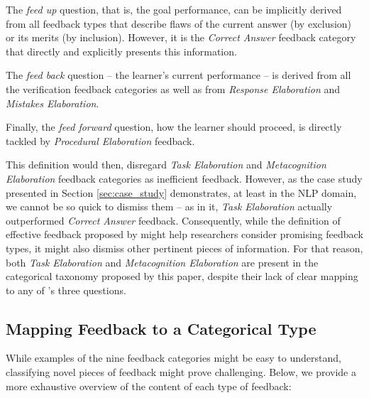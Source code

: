 The \textit{feed up} question, that is, the goal performance, can be implicitly derived from all feedback types that describe flaws of the current answer (by exclusion) or its merits (by inclusion). However, it is the \textit{Correct Answer} feedback category that directly and explicitly presents this information.

The \textit{feed back} question -- the learner's current performance -- is derived from all the verification feedback categories as well as from \textit{Response Elaboration} and \textit{Mistakes Elaboration}.

Finally, the \textit{feed forward} question, how the learner should proceed, is directly tackled by \textit{Procedural Elaboration} feedback.

This definition would then, disregard \textit{Task Elaboration} and \textit{Metacognition Elaboration} feedback categories as inefficient feedback. However, as the case study presented in Section \ref{sec:case_study} demonstrates, at least in the NLP domain, we cannot be so quick to dismiss them -- as in it, \textit{Task Elaboration} actually outperformed \textit{Correct Answer} feedback. Consequently, while the definition of effective feedback proposed by \citet{hattie_power_2007} might help researchers consider promising feedback types, it might also dismiss other pertinent pieces of information. For that reason, both \textit{Task Elaboration} and \textit{Metacognition Elaboration} are present in the categorical taxonomy proposed by this paper, despite their lack of clear mapping to any of \citet{hattie_power_2007}'s three questions.

\subsection{Mapping Feedback to a Categorical Type}
\label{app:categorial_mapping}

While examples of the nine feedback categories might be easy to understand, classifying novel pieces of feedback might prove challenging. Below, we provide a more exhaustive overview of the content of each type of feedback:


